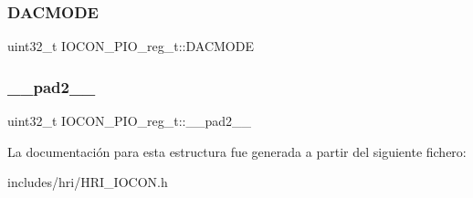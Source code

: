 \subsubsection{\texorpdfstring{D\+A\+C\+M\+O\+DE}{DACMODE}}
{\footnotesize\ttfamily uint32\+\_\+t I\+O\+C\+O\+N\+\_\+\+P\+I\+O\+\_\+reg\+\_\+t\+::\+D\+A\+C\+M\+O\+DE}

\mbox{\label{structIOCON__PIO__reg__t_ab0868bdf2f023282a5d63b39b269abf5}} 
\subsubsection{\texorpdfstring{\+\_\+\+\_\+pad2\+\_\+\+\_\+}{\_\_pad2\_\_}}
{\footnotesize\ttfamily uint32\+\_\+t I\+O\+C\+O\+N\+\_\+\+P\+I\+O\+\_\+reg\+\_\+t\+::\+\_\+\+\_\+pad2\+\_\+\+\_\+}



La documentación para esta estructura fue generada a partir del siguiente fichero\+:\begin{DoxyCompactItemize}
\item 
includes/hri/H\+R\+I\+\_\+\+I\+O\+C\+O\+N.\+h\end{DoxyCompactItemize}
